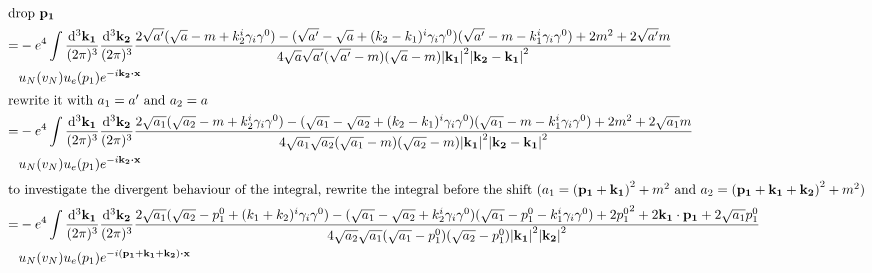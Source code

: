 \documentclass{article}
\newcommand{\g}{\gamma}
\begin{document}
\begin{align*}
  \intertext{drop $\vb{p_1}$}
  =&-e^4\int\frac{\dd^3\vb{k_1}}{(2\pi)^3}\frac{\dd^3\vb{k_2}}{(2\pi)^3}
  \frac{2\sqrt{a'}(\sqrt{a}-m+k_2^i\g_i\g^0)-(\sqrt{a'}-\sqrt{a}+(k_2-k_1)^i\g_i\g^0)(\sqrt{a'}-m-k_1^i\g_i\g^0)+2m^2+2\sqrt{a'}m}{4\sqrt{a}\sqrt{a'}(\sqrt{a'}-m)(\sqrt{a}-m){\vb{\abs{k_1}}^2\vb{\abs{k_2-k_1}}^2}}\\&
  u_N(v_N)u_e(p_1)e^{-i\vb{k_2}\vdot \vb{x}}\\
  \intertext{rewrite it with $a_1=a'$ and $a_2=a$}
   =&-e^4\int\frac{\dd^3\vb{k_1}}{(2\pi)^3}\frac{\dd^3\vb{k_2}}{(2\pi)^3}
   \frac{2\sqrt{a_1}(\sqrt{a_2}-m+k_2^i\g_i\g^0)-(\sqrt{a_1}-\sqrt{a_2}+(k_2-k_1)^i\g_i\g^0)(\sqrt{a_1}-m-k_1^i\g_i\g^0)+2m^2+2\sqrt{a_1}m}{4\sqrt{a_1}\sqrt{a_2}(\sqrt{a_1}-m)(\sqrt{a_2}-m){\vb{\abs{k_1}}^2\vb{\abs{k_2-k_1}}^2}}\\&
    u_N(v_N)u_e(p_1)e^{-i\vb{k_2}\vdot \vb{x}}\\
	\intertext{to investigate the divergent behaviour of the integral, rewrite the integral before the shift ($a_1=\pqty{\vb{p_1+k_1}}^2+m^2$ and $a_2=\pqty{\vb{p_1+k_1+k_2}}^2+m^2$)}
  =&-e^4\int\frac{\dd^3\vb{k_1}}{(2\pi)^3}\frac{\dd^3\vb{k_2}}{(2\pi)^3}
  \frac{2\sqrt{a_1}(\sqrt{a_2}-p_1^0+(k_1+k_2)^i\g_i\g^0)-(\sqrt{a_1}-\sqrt{a_2}+k_2^i\g_i\g^0)(\sqrt{a_1}-p_1^0-k_1^i\g_i\g^0)+2{p_1^0}^2+2\vb{k_1\cdot p_1}+2\sqrt{a_1}p_1^0}{4\sqrt{a_2}\sqrt{a_1}(\sqrt{a_1}-p_1^0)(\sqrt{a_2}-p_1^0){\vb{\abs{k_1}}^2\vb{\abs{k_2}}^2}}\\&
  u_N(v_N)u_e(p_1)e^{-i\vb{(p_1+k_1+k_2)}\vdot \vb{x}}

\end{align*}
\end{document}
